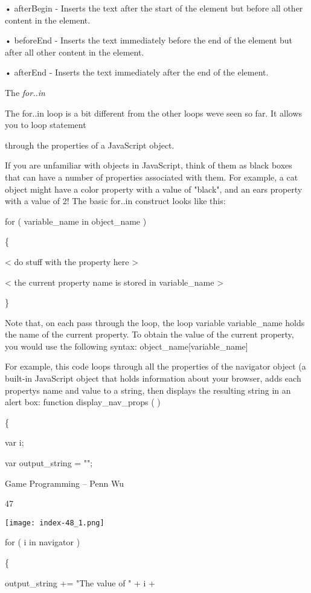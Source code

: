 \documentclass[
]{article}
\begin{document}
• afterBegin - Inserts the text after the start of the element but
before all other content in the element.

• beforeEnd - Inserts the text immediately before the end of the element
but after all other content in the element.

• afterEnd - Inserts the text immediately after the end of the element.

The \emph{for..in}

The for..in loop is a bit different from the other loops
we\textquotesingle ve seen so far. It allows you to loop statement

through the properties of a JavaScript object.

If you are unfamiliar with objects in JavaScript, think of them as black
boxes that can have a number of properties associated with them. For
example, a cat object might have a color property with a value of
"black", and an ears property with a value of 2! The basic for..in
construct looks like this:

for ( variable\_name in object\_name )

\{

\textless{} do stuff with the property here \textgreater{}

\textless{} the current property name is stored in variable\_name
\textgreater{}

\}

Note that, on each pass through the loop, the loop variable
variable\_name holds the name of the current property. To obtain the
value of the current property, you would use the following syntax:
object\_name{[}variable\_name{]}

For example, this code loops through all the properties of the navigator
object (a built-in JavaScript object that holds information about your
browser, adds each property\textquotesingle s name and value to a
string, then displays the resulting string in an alert box: function
display\_nav\_props ( )

\{

var i;

var output\_string = "";

Game Programming -- Penn Wu

47

\protect\hypertarget{index_split_004.htmlux5cux23p48}{}{}\texttt{[image: index-48\_1.png]}

for ( i in navigator )

\{

output\_string += "The value of " + i +
\end{document}
